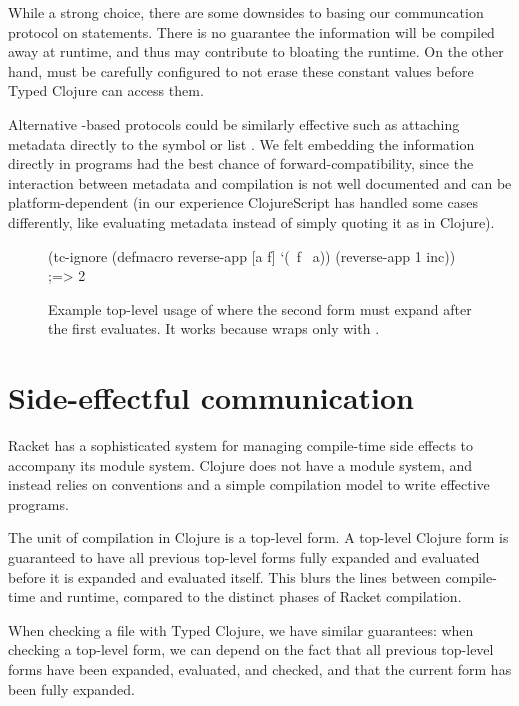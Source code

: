 While a strong choice, there are some downsides to basing our communcation protocol on 
statements.
There is no guarantee the information will be compiled away at runtime, and
thus may contribute to bloating the runtime.
On the other hand,  must be carefully configured to not erase these constant
values before Typed Clojure can access them.

Alternative -based protocols could be similarly effective
such as attaching metadata directly to the symbol  or list .
We felt embedding the information directly in programs had the best chance of forward-compatibility,
since the interaction between metadata and compilation is not well documented and
can be platform-dependent (in our experience ClojureScript has handled some cases differently,
like evaluating metadata instead of simply quoting it as in Clojure).

\begin{figure}
\begin{cljlisting}
(tc-ignore
  (defmacro reverse-app [a f] `(~f ~a))
  (reverse-app 1 inc)) ;=> 2
\end{cljlisting}
  \caption{Example top-level usage of 
           where the second form must expand after the first evaluates.
  It works because  wraps only with .}
  \label{fig:analyzer:tc-ignore-usage}
\end{figure}

\section{Side-effectful communication}

Racket has a sophisticated system for managing compile-time side effects
to accompany its module system.
Clojure does not have a module system, and instead relies on conventions
and a simple compilation model to write effective programs.

The unit of compilation in Clojure is a top-level form. A top-level Clojure form
is guaranteed to have all previous top-level forms fully expanded
and evaluated before it is expanded and evaluated itself.
This blurs the lines between compile-time and runtime, compared to the
distinct phases of Racket compilation.

When checking a file with Typed Clojure, we have similar guarantees:
when checking a top-level form, we can depend on the fact that all
previous top-level forms have been expanded, evaluated, and checked,
and that the current form has been fully expanded.


